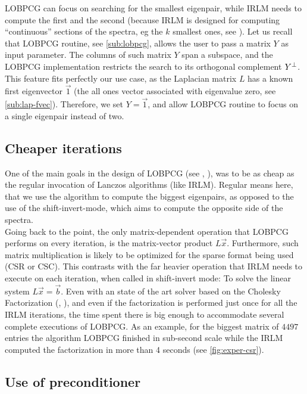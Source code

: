 \gls{LOBPCG} can focus on searching for the smallest eigenpair, while
\gls{IRLM} needs to compute the first and the 
second (because \gls{IRLM} is designed for computing ``continuous''
sections of the spectra, eg the $k$ smallest ones, see
\cite{arpack}). Let us recall that 
\gls{LOBPCG} routine, see \cref{sub:lobpcg}, allows the user to pass a
matrix $Y$ as input parameter. The columns of such matrix $Y$ span a
subspace, and the \gls{LOBPCG} implementation restricts the search to its orthogonal
complement ${Y}^{\bot}$. This feature fits perfectly our use case, as 
the Laplacian matrix $L$ has a known first eigenvector $\vec{1}$ (the all
ones vector associated with eigenvalue zero, see
\cref{sub:lap-fvec}). Therefore, we set $Y = \vec{1}$,
and allow \gls{LOBPCG} routine to focus on a single eigenpair instead of two.

\subsection{Cheaper iterations}

One of the main goals in the design of \gls{LOBPCG} (see
\cite{knyazev01}, \cite{knyazev03}),
was to be as cheap as the regular invocation of Lanczos
algorithms (like \gls{IRLM}). Regular means here, that
we use the algorithm to compute the biggest eigenpairs, as opposed to
the use of the shift-invert-mode, which aims to compute the opposite
side of the spectra. \\

Going back to the point, the
only matrix-dependent operation that \gls{LOBPCG} performs on every
iteration, is the matrix-vector product $L\vec{x}$. Furthermore, such matrix
multiplication is likely to be optimized for the sparse format being
used (CSR or CSC). This contrasts with the far heavier operation that
\gls{IRLM} needs to execute on each iteration, when called in
shift-invert mode: To solve the linear system $L\vec{x} =
\vec{b}$. Even with an state of the art solver based on the Cholesky
Factorization (\cite{cholmod08}, \cite{cholmod08a}), and even if
the factorization is performed just once for all the \gls{IRLM}
iterations, the time spent there is big enough to accommodate several
complete executions of \gls{LOBPCG}. As an example, for the biggest
matrix of $4497$ entries the algorithm \gls{LOBPCG} finished in
sub-second scale while the \gls{IRLM} computed the factorization in
more than 4 seconds (see \cref{fig:exper-csr}).


\subsection{Use of preconditioner}

